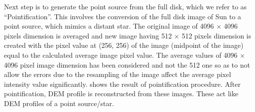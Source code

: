 Next step is to generate the point source from the full disk, which we refer to as ``Pointification''. This involves the conversion of the full disk image of Sun to a point source, which mimics a distant star. The original image of 4096 $\times$ 4096 pixels dimension is averaged and new image having 512 $\times$ 512 pixels dimension is created with the pixel value at (256, 256) of the image (midpoint of the image) equal to the calculated average image pixel value. The average values of 4096 $\times$ 4096 pixel image dimension has been considered and not the 512 one so as to not allow the errors due to the resampling of the image affect the average pixel intensity value significantly.  shows the result of pointification procedure. After pointification, DEM profile is reconstructed from these images. These act like DEM profiles of a point source/star.\\

